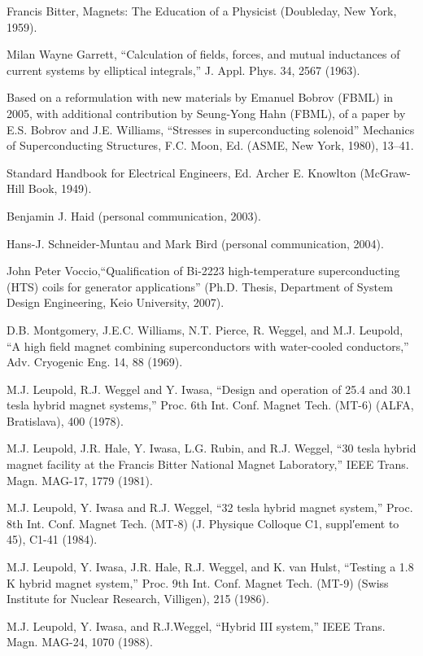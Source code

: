 \noindent [3.4] Francis Bitter, Magnets: The Education of a Physicist (Doubleday, New York,
1959).

\noindent [3.5] Milan Wayne Garrett, ``Calculation of fields, forces, and mutual inductances of
current systems by elliptical integrals,” J. Appl. Phys. 34, 2567 (1963).

\noindent [3.6] Based on a reformulation with new materials by Emanuel Bobrov (FBML) in
2005, with additional contribution by Seung-Yong Hahn (FBML), of a paper by
E.S. Bobrov and J.E. Williams, ``Stresses in superconducting solenoid” Mechanics
of Superconducting Structures, F.C. Moon, Ed. (ASME, New York, 1980), 13–41.

\noindent [3.7] Standard Handbook for Electrical Engineers, Ed. Archer E. Knowlton (McGraw-
Hill Book, 1949).

\noindent [3.8] Benjamin J. Haid (personal communication, 2003).

\noindent [3.9] Hans-J. Schneider-Muntau and Mark Bird (personal communication, 2004).

\noindent [3.10] John Peter Voccio,``Qualification of Bi-2223 high-temperature superconducting
(HTS) coils for generator applications” (Ph.D. Thesis, Department of System Design
Engineering, Keio University, 2007).

\noindent [3.11] D.B. Montgomery, J.E.C. Williams, N.T. Pierce, R. Weggel, and M.J. Leupold,
``A high field magnet combining superconductors with water-cooled conductors,”
Adv. Cryogenic Eng. 14, 88 (1969).

\noindent [3.12] M.J. Leupold, R.J. Weggel and Y. Iwasa, ``Design and operation of 25.4 and 30.1 tesla hybrid magnet systems,” Proc. 6th Int. Conf. Magnet Tech. (MT-6) (ALFA,
Bratislava), 400 (1978).

\noindent [3.13] M.J. Leupold, J.R. Hale, Y. Iwasa, L.G. Rubin, and R.J. Weggel, ``30 tesla hybrid
magnet facility at the Francis Bitter National Magnet Laboratory,” IEEE Trans.
Magn. MAG-17, 1779 (1981).

\noindent [3.14] M.J. Leupold, Y. Iwasa and R.J. Weggel, ``32 tesla hybrid magnet system,” Proc.
8th Int. Conf. Magnet Tech. (MT-8) (J. Physique Colloque C1, suppl′ement to 45),
C1-41 (1984).

\noindent [3.15] M.J. Leupold, Y. Iwasa, J.R. Hale, R.J. Weggel, and K. van Hulst, ``Testing a
1.8 K hybrid magnet system,” Proc. 9th Int. Conf. Magnet Tech. (MT-9) (Swiss
Institute for Nuclear Research, Villigen), 215 (1986).

\noindent [3.16] M.J. Leupold, Y. Iwasa, and R.J.Weggel, ``Hybrid III system,” IEEE Trans. Magn. MAG-24, 1070 (1988).

